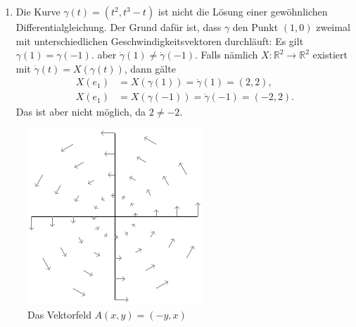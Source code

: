 \documentclass[../main.tex]{subfiles}
\begin{document}
\begin{examples}
\begin{enumerate}[(1)]
    \item Die Kurve $\gamma(t) = (t^2, t^3 - t)$ ist
      nicht die Lösung einer gewöhnlichen Differentialgleichung.
      Der Grund dafür ist, dass $\gamma$ den Punkt
      $(1, 0)$ zweimal mit unterschiedlichen Geschwindigkeitsvektoren
      durchläuft: Es gilt $\gamma(1) = \gamma(-1)$.
      aber $\dot \gamma(1) \neq \dot \gamma(-1)$.
      Falls nämlich $X \colon \mathbb{R}^2 \to \mathbb{R}^2$ 
      existiert mit $\dot \gamma (t) = X ( \gamma(t))$,
      dann gälte
      \begin{align*}
        X(e_1) &= X(\gamma(1)) = \dot \gamma(1) = (2, 2),\\
        X(e_1) &= X(\gamma(-1)) = \dot \gamma(-1) = (-2, 2).
      \end{align*}
      Das ist aber nicht möglich, da $2 \neq -2$.
  \end{enumerate}
\end{examples}

\begin{figure}[htb] 
  \centering
  \includegraphics{figures/rotationfield}
  \caption{Das Vektorfeld $A(x, y) = (-y, x)$}
  \label{fig:vectorfields-examples}
\end{figure}
\end{document}
